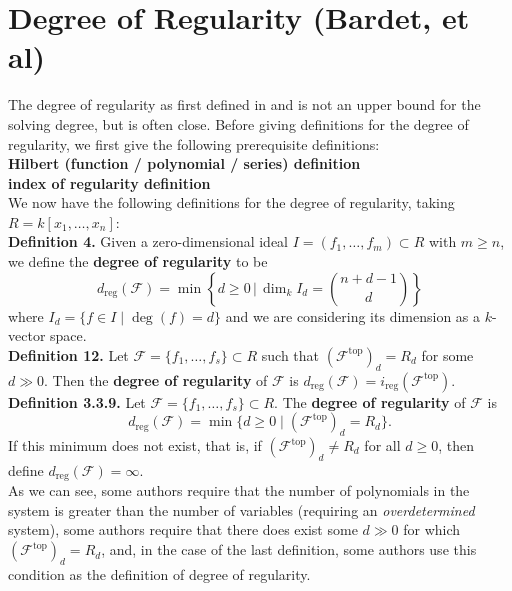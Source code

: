 \documentclass[11pt]{article}
\begin{document}
\newpage

\section*{Degree of Regularity (Bardet, et al)}

The degree of regularity as first defined in \cite{bardet2004etude} and \cite{bardet2004complexity} is not an upper bound for the solving degree, but is often close. Before giving definitions for the degree of regularity, we first give the following prerequisite definitions: \\

\noindent \textbf{Hilbert (function / polynomial / series) definition} \\

\noindent \textbf{index of regularity definition} \\

We now have the following definitions for the degree of regularity, taking $R = k[x_1, \dots, x_n]$: \\

\noindent \textbf{\cite{bardet2004complexity} Definition 4.} Given a zero-dimensional ideal $I = (f_1, \dots, f_m) \subset R$ with $m \geq n$, we define the \textbf{degree of regularity} to be \[ d_\text{reg}(\mathcal{F}) = \min \left\{ d \geq 0 \, \bigg| \, \dim_k I_d = \binom{n + d - 1}{d} \right\} \] where $I_d = \{f \in I \mid \deg(f) = d\}$ and we are considering its dimension as a $k$-vector space. \\

\noindent \textbf{\cite{caminata2020solving} Definition 12.} Let $\mathcal{F} = \{f_1, \dots, f_s\} \subset R$ such that $(\mathcal{F}^\text{top})_d = R_d$ for some $d \gg 0$. Then the \textbf{degree of regularity} of $\mathcal{F}$ is $d_\text{reg}(\mathcal{F}) = i_\text{reg}(\mathcal{F}^\text{top})$. \\

\noindent \textbf{\cite{minko2021security} Definition 3.3.9.} Let $\mathcal{F} = \{f_1, \dots, f_s\} \subset R$. The \textbf{degree of regularity} of $\mathcal{F}$ is \[ d_\text{reg}(\mathcal{F}) = \min\{d \geq 0 \mid (\mathcal{F}^\text{top})_d = R_d\}. \] If this minimum does not exist, that is, if $(\mathcal{F}^\text{top})_d \neq R_d$ for all $d \geq 0$, then define $d_\text{reg} (\mathcal{F}) = \infty$. \\

As we can see, some authors require that the number of polynomials in the system is greater than the number of variables (requiring an \emph{overdetermined} system), some authors require that there does exist some $d \gg 0$ for which $(\mathcal{F}^\text{top})_d = R_d$, and, in the case of the last definition, some authors use this condition as the definition of degree of regularity. 










\newpage


\end{document}
